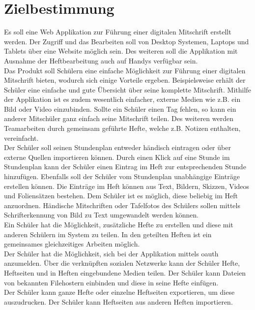 \documentclass[12pt,a4paper,oneside,ngerman]{scrartcl}
\begin{document}
\section{Zielbestimmung}
Es soll eine Web Applikation zur Führung einer digitalen Mitschrift erstellt werden. Der Zugriff und das Bearbeiten soll von Desktop Systemen, Laptops und Tablets über eine Website möglich sein. Des weiteren soll die Applikation mit Ausnahme der Heftbearbeitung auch auf Handys verfügbar sein. \\

Das Produkt soll Schülern eine einfache Möglichkeit zur Führung einer digitalen Mitschrift bieten, wodurch sich einige Vorteile ergeben. Beispielsweise erhält der Schüler eine einfache und gute Übersicht über seine komplette Mitschrift. Mithilfe der Applikation ist es zudem wesentlich einfacher, externe Medien wie z.B. ein Bild oder Video einzubinden. Sollte ein Schüler einen Tag fehlen, so kann ein anderer Mitschüler ganz einfach seine Mitschrift teilen. Des weiteren werden Teamarbeiten durch gemeinsam geführte Hefte, welche z.B. Notizen enthalten, vereinfacht.\\

Der Schüler soll seinen Stundenplan entweder händisch eintragen oder über externe Quellen importieren können. Durch einen Klick auf eine Stunde im Stundenplan kann der Schüler einen Eintrag im Heft zur entsprechenden Stunde hinzufügen. Ebenfalls soll der Schüler vom Stundenplan unabhängige Einträge erstellen können. Die Einträge im Heft können aus Text, Bildern, Skizzen, Videos und Foliensätzen bestehen. Dem Schüler ist es möglich, diese beliebig im Heft anzuordnen. Händische Mitschriften oder Tafelfotos des Schülers sollen mittels Schrifterkennung von Bild zu Text umgewandelt werden können.\\

Ein Schüler hat die Möglichkeit, zusätzliche Hefte zu erstellen und diese mit anderen Schülern im System zu teilen. In den
geteilten Heften ist ein gemeinsames gleichzeitiges Arbeiten möglich.\\

Der Schüler hat die Möglichkeit, sich bei der Applikation mittels \gls{oauth} anzumelden. Über die verknüpften sozialen Netzwerke
kann der Schüler Hefte, Heftseiten und in Heften eingebundene Medien teilen. Der Schüler kann Dateien von bekannten Filehostern einbinden und diese in seine Hefte einfügen.\\

Der Schüler kann ganze Hefte oder einzelne Heftseiten exportieren, um diese auszudrucken. Der Schüler kann Heftseiten aus anderen Heften importieren.
\end{document}
